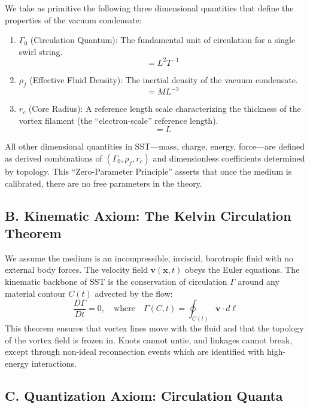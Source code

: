 \documentclass[11pt]{article}
\begin{document}
We take as primitive the following three dimensional quantities that define the properties of the vacuum condensate:
\begin{enumerate}
\item $\Gamma_0$ (Circulation Quantum): The fundamental unit of circulation for a single swirl string.
\begin{equation}
[\Gamma_0] = L^2 T^{-1}
\end{equation}
\item $\rho_f$ (Effective Fluid Density): The inertial density of the vacuum condensate.
\begin{equation}
[\rho_f] = M L^{-3}
\end{equation}
    \item $r_c$ (Core Radius): A reference length scale characterizing the thickness of the vortex filament (the ``electron-scale'' reference length).
\begin{equation}
[r_c] = L
\end{equation}
\end{enumerate}
All other dimensional quantities in SST---mass, charge, energy, force---are defined as derived combinations of $(\Gamma_0, \rho_f, r_c)$ and dimensionless coefficients determined by topology. This ``Zero-Parameter Principle'' asserts that once the medium is calibrated, there are no free parameters in the theory.

\subsection*{B. Kinematic Axiom: The Kelvin Circulation Theorem}

We assume the medium is an incompressible, inviscid, barotropic fluid with no external body forces. The velocity field $\mathbf{v}(\mathbf{x},t)$ obeys the Euler equations. The kinematic backbone of SST is the conservation of circulation $\Gamma$ around any material contour $C(t)$ advected by the flow:
\begin{equation}
\frac{D\Gamma}{Dt} = 0, \quad \text{where} \quad \Gamma(C,t) = \oint_{C(t)} \mathbf{v} \cdot d\boldsymbol{\ell}
\end{equation}
This theorem ensures that vortex lines move with the fluid and that the topology of the vortex field is frozen in. Knots cannot untie, and linkages cannot break, except through non-ideal reconnection events which are identified with high-energy interactions.

\subsection*{C. Quantization Axiom: Circulation Quanta}
\end{document}
